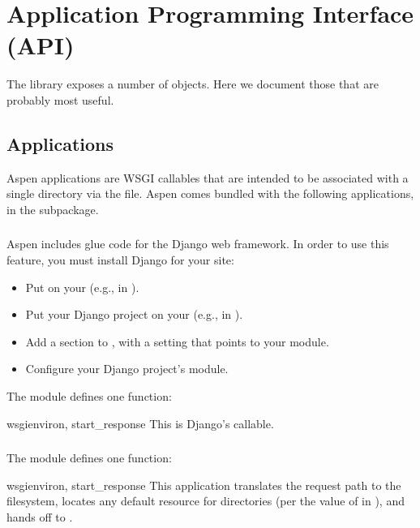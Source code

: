 \chapter{Application Programming Interface (API)}
\label{api}

The  library exposes a number of objects. Here we document those
that are probably most useful.


\section{Applications}
\label {api-apps}

Aspen applications are WSGI callables that are intended to be associated with a
single directory via the  file. Aspen comes bundled with the
following applications, in the  subpackage.


\subsection{}
\label{api-apps-django}

Aspen includes glue code for the Django web framework. In order to use this
feature, you must install Django for your site:

\begin{itemize}
\item{Put  on your  (e.g., in ).}
\item{Put your Django project on your  (e.g., in ).}
\item{Add a \code{[django]} section to , with a  setting that points to your  module.}
\item{Configure your Django project's  module.}
\end{itemize}

The  module defines one function:

\begin{funcdesc}{wsgi}{environ, start_response}
This is Django's  callable.
\end{funcdesc}

\subsection{}
\label{api-apps-static}

The  module defines one function:

\begin{funcdesc}{wsgi}{environ, start_response} This application translates the
request path to the filesystem, locates any default resource for directories
(per the value of  in ), and hands off to
. \end{funcdesc}
